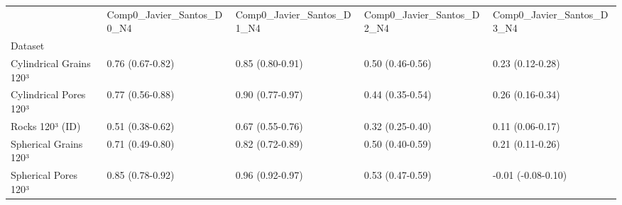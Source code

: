 \begin{tabular}{lllll}
\toprule
 & Comp0_Javier_Santos_D0_N4 & Comp0_Javier_Santos_D1_N4 & Comp0_Javier_Santos_D2_N4 & Comp0_Javier_Santos_D3_N4 \\
Dataset &  &  &  &  \\
\midrule
Cylindrical Grains 120³ & 0.76 (0.67-0.82) & 0.85 (0.80-0.91) & 0.50 (0.46-0.56) & 0.23 (0.12-0.28) \\
Cylindrical Pores 120³ & 0.77 (0.56-0.88) & 0.90 (0.77-0.97) & 0.44 (0.35-0.54) & 0.26 (0.16-0.34) \\
Rocks 120³ (ID) & 0.51 (0.38-0.62) & 0.67 (0.55-0.76) & 0.32 (0.25-0.40) & 0.11 (0.06-0.17) \\
Spherical Grains 120³ & 0.71 (0.49-0.80) & 0.82 (0.72-0.89) & 0.50 (0.40-0.59) & 0.21 (0.11-0.26) \\
Spherical Pores 120³ & 0.85 (0.78-0.92) & 0.96 (0.92-0.97) & 0.53 (0.47-0.59) & -0.01 (-0.08-0.10) \\
\bottomrule
\end{tabular}
